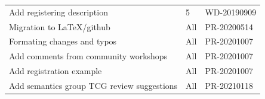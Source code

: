 \documentclass[11pt,a4paper]{ivoa}
\begin{document}
\begin{table}[H]
\begin{tabular}{p{3.75in}p{0.92in}p{0.8in}}
\multicolumn{1}{|p{3.75in}}{Add registering description} &
\multicolumn{1}{|p{0.72in}}{5} &
\multicolumn{1}{|p{0.9in}|}{{\fontsize{10pt}{12.0pt}\selectfont WD-20190909}} \\
\multicolumn{1}{|p{3.75in}}{Migration to LaTeX/github} &
\multicolumn{1}{|p{0.72in}}{All} &
\multicolumn{1}{|p{0.9in}|}{{\fontsize{10pt}{12.0pt}\selectfont PR-20200514}} \\
\multicolumn{1}{|p{3.75in}}{Formating changes and typos} &
\multicolumn{1}{|p{0.72in}}{All} &
\multicolumn{1}{|p{0.9in}|}{{\fontsize{10pt}{12.0pt}\selectfont PR-20201007}} \\
\multicolumn{1}{|p{3.75in}}{Add comments from community workshops} &
\multicolumn{1}{|p{0.72in}}{All} &
\multicolumn{1}{|p{0.9in}|}{{\fontsize{10pt}{12.0pt}\selectfont PR-20201007}} \\
\multicolumn{1}{|p{3.75in}}{Add registration example} &
\multicolumn{1}{|p{0.72in}}{All} &
\multicolumn{1}{|p{0.9in}|}{{\fontsize{10pt}{12.0pt}\selectfont PR-20201007}} \\
\multicolumn{1}{|p{3.75in}}{Add semantics group TCG review suggestions} &
\multicolumn{1}{|p{0.72in}}{All} &
\multicolumn{1}{|p{0.9in}|}{{\fontsize{10pt}{12.0pt}\selectfont PR-20210118}} \\

\hline
\end{tabular}
 \end{table}

\pagebreak

\end{document}
